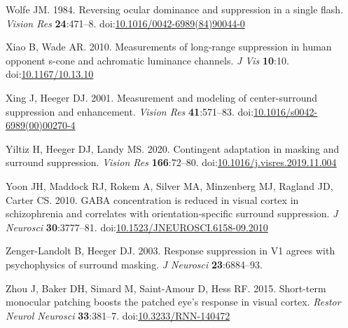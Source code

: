 \documentclass[]{article}
\begin{document}
\leavevmode\hypertarget{ref-Wolfe1984}{}%
Wolfe JM. 1984. Reversing ocular dominance and suppression in a single flash. \emph{Vision Res} \textbf{24}:471--8. doi:\href{https://doi.org/10.1016/0042-6989(84)90044-0}{10.1016/0042-6989(84)90044-0}

\leavevmode\hypertarget{ref-Xiao2010}{}%
Xiao B, Wade AR. 2010. Measurements of long-range suppression in human opponent s-cone and achromatic luminance channels. \emph{J Vis} \textbf{10}:10. doi:\href{https://doi.org/10.1167/10.13.10}{10.1167/10.13.10}

\leavevmode\hypertarget{ref-Xing2001}{}%
Xing J, Heeger DJ. 2001. Measurement and modeling of center-surround suppression and enhancement. \emph{Vision Res} \textbf{41}:571--83. doi:\href{https://doi.org/10.1016/s0042-6989(00)00270-4}{10.1016/s0042-6989(00)00270-4}

\leavevmode\hypertarget{ref-Yiltiz2020}{}%
Yiltiz H, Heeger DJ, Landy MS. 2020. Contingent adaptation in masking and surround suppression. \emph{Vision Res} \textbf{166}:72--80. doi:\href{https://doi.org/10.1016/j.visres.2019.11.004}{10.1016/j.visres.2019.11.004}

\leavevmode\hypertarget{ref-Yoon2010}{}%
Yoon JH, Maddock RJ, Rokem A, Silver MA, Minzenberg MJ, Ragland JD, Carter CS. 2010. GABA concentration is reduced in visual cortex in schizophrenia and correlates with orientation-specific surround suppression. \emph{J Neurosci} \textbf{30}:3777--81. doi:\href{https://doi.org/10.1523/JNEUROSCI.6158-09.2010}{10.1523/JNEUROSCI.6158-09.2010}

\leavevmode\hypertarget{ref-Zenger-Landolt2003}{}%
Zenger-Landolt B, Heeger DJ. 2003. Response suppression in V1 agrees with psychophysics of surround masking. \emph{J Neurosci} \textbf{23}:6884--93.

\leavevmode\hypertarget{ref-Zhou2015}{}%
Zhou J, Baker DH, Simard M, Saint-Amour D, Hess RF. 2015. Short-term monocular patching boosts the patched eye's response in visual cortex. \emph{Restor Neurol Neurosci} \textbf{33}:381--7. doi:\href{https://doi.org/10.3233/RNN-140472}{10.3233/RNN-140472}
\end{document}
